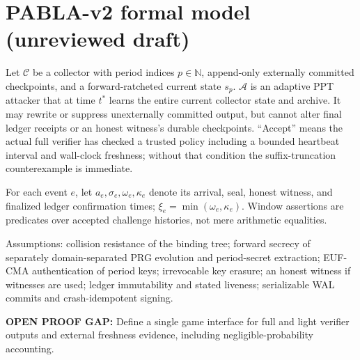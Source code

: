\section*{PABLA-v2 formal model (unreviewed draft)}
\newcommand{\todo}[1]{\par\textbf{OPEN PROOF GAP:} #1\par}
Let $\mathcal{C}$ be a collector with period indices $p\in\mathbb{N}$,
append-only externally committed checkpoints, and a forward-ratcheted
current state $s_p$. $\mathcal{A}$ is an adaptive PPT attacker that at time
$t^*$ learns the entire current collector state and archive. It may rewrite
or suppress unexternally committed output, but cannot alter final ledger
receipts or an honest witness's durable checkpoints. ``Accept'' means the
actual full verifier has checked a trusted policy including a bounded
heartbeat interval and wall-clock freshness; without that condition the
suffix-truncation counterexample is immediate.

For each event $e$, let $a_e,\sigma_e,\omega_e,\kappa_e$ denote its
arrival, seal, honest witness, and finalized ledger confirmation times;
$\xi_e=\min(\omega_e,\kappa_e)$. Window assertions are predicates over
accepted challenge histories, not mere arithmetic equalities.

Assumptions: collision resistance of the binding tree; forward secrecy of
separately domain-separated PRG evolution and period-secret extraction;
EUF-CMA authentication of period keys; irrevocable key erasure; an honest
witness if witnesses are used; ledger immutability and stated liveness;
serializable WAL commits and crash-idempotent signing.

\todo{Define a single game interface for full and light verifier outputs and
external freshness evidence, including negligible-probability accounting.}

